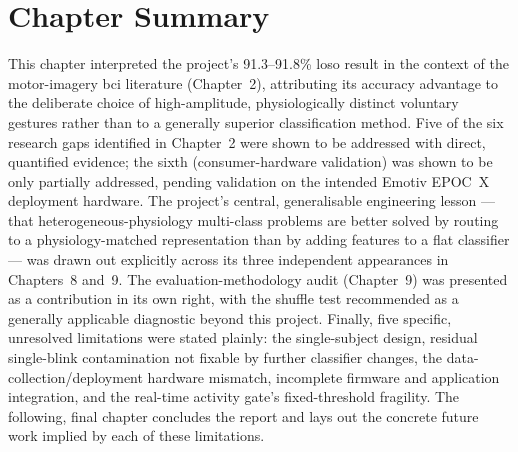 \section{Chapter Summary}
\label{sec:disc_summary}

This chapter interpreted the project's 91.3--91.8\% \acrshort{loso}
result in the context of the motor-imagery \acrshort{bci}
literature (Chapter~2), attributing its accuracy advantage to the
deliberate choice of high-amplitude, physiologically distinct
voluntary gestures rather than to a generally superior
classification method. Five of the six research gaps identified in
Chapter~2 were shown to be addressed with direct, quantified
evidence; the sixth (consumer-hardware validation) was shown to be
only partially addressed, pending validation on the intended Emotiv
EPOC~X deployment hardware. The project's central, generalisable
engineering lesson --- that heterogeneous-physiology multi-class
problems are better solved by routing to a physiology-matched
representation than by adding features to a flat classifier --- was
drawn out explicitly across its three independent appearances in
Chapters~8 and~9. The evaluation-methodology audit (Chapter~9) was
presented as a contribution in its own right, with the shuffle test
recommended as a generally applicable diagnostic beyond this
project. Finally, five specific, unresolved limitations were stated
plainly: the single-subject design, residual single-blink
contamination not fixable by further classifier changes, the
data-collection/deployment hardware mismatch, incomplete firmware
and application integration, and the real-time activity gate's
fixed-threshold fragility. The following, final chapter concludes
the report and lays out the concrete future work implied by each of
these limitations.